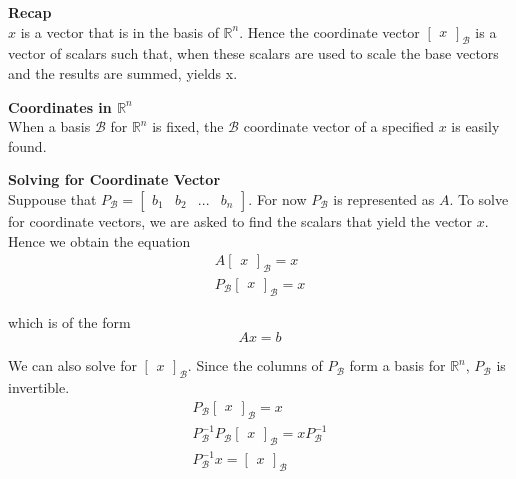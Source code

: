 \documentclass{article}
\begin{document}
  \textbf{Recap}\\
  $ x $ is a vector that is in the basis of $ \mathbb{R}^{n} $. Hence the coordinate vector $ \begin{bmatrix}
    x
  \end{bmatrix}_\mathcal{B} $ is a vector of scalars such that, when these scalars are used to scale the base vectors and the results are summed, yields x. 

  \textbf{Coordinates in $ \mathbb{R}^{n} $}\\
  When a basis $ \mathcal{B} $ for $ \mathbb{R}^{n} $ is fixed, the $ \mathcal{B} $ coordinate vector of a specified $ x $ is easily found.

  \textbf{Solving for Coordinate Vector}\\
  Suppouse that $ P_\mathcal{B} = \begin{bmatrix}
    b_1 &b_2 &... &b_n
  \end{bmatrix} $. For now $ P_\mathcal{B} $ is represented as $ A $. To solve for coordinate vectors, we are asked to find the scalars that yield the vector $ x $. Hence we obtain the equation
  \[
    \begin{gathered}
    A\begin{bmatrix}
      x
    \end{bmatrix}_\mathcal{B}=x\\
    P_\mathcal{B}\begin{bmatrix}
      x
    \end{bmatrix}_\mathcal{B}=x
    \end{gathered}
  \]

  which is of the form
  \[
    Ax=b
  \]

  We can also solve for $ \begin{bmatrix}
    x
  \end{bmatrix}_\mathcal{B} $. Since the columns of $ P_\mathcal{B} $ form a basis for $ \mathbb{R}^{n} $, $ P_\mathcal{B} $ is invertible.  
  \[
    \begin{gathered}
    P_\mathcal{B}\begin{bmatrix}
      x
    \end{bmatrix}_\mathcal{B}=x\\
    P^{-1}_\mathcal{B}P_\mathcal{B}\begin{bmatrix}
      x
    \end{bmatrix}_\mathcal{B}=xP^{-1}_\mathcal{B}\\
    P^{-1}_\mathcal{B}x=\begin{bmatrix}
      x
    \end{bmatrix}_\mathcal{B} 
    \end{gathered}
  \]
\end{document}
